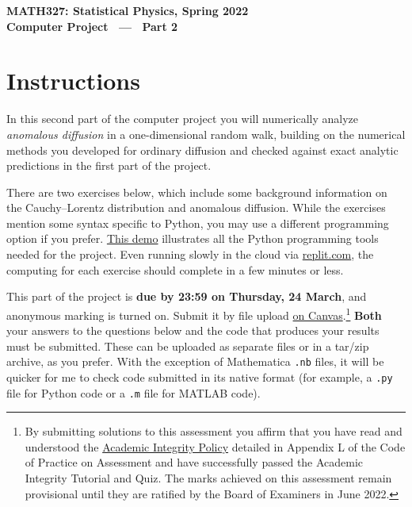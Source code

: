 \documentclass[12 pt]{article} %
\begin{document}
\newcommand{\thisunit}{MATH327 Project Part 2}
\newcommand{\moddate}{Last modified 23 Mar.~2022}
\begin{center}
  {\Large \textbf{MATH327: Statistical Physics, Spring 2022}} \\[12 pt]
  {\Large \textbf{Computer Project \ --- \ Part 2}} \\[24 pt]
\end{center}

\section*{Instructions}
In this second part of the computer project you will numerically analyze \textit{anomalous diffusion} in a one-dimensional random walk, building on the numerical methods you developed for ordinary diffusion and checked against exact analytic predictions in the first part of the project.

There are two exercises below, which include some background information on the Cauchy--Lorentz distribution and anomalous diffusion.
While the exercises mention some syntax specific to Python, you may use a different programming option if you prefer.
\href{https://tinyurl.com/math327demo}{This demo} illustrates all the Python programming tools needed for the project.
Even running slowly in the cloud via \href{https://replit.com/languages/python3}{replit.com}, the computing for each exercise should complete in a few minutes or less.

This part of the project is \textbf{due by 23:59 on Thursday, 24 March}, and anonymous marking is turned on.
Submit it by file upload \href{https://liverpool.instructure.com/courses/47333/assignments/178543}{on Canvas}.\footnote{By submitting solutions to this assessment you affirm that you have read and understood the \href{https://www.liverpool.ac.uk/media/livacuk/tqsd/code-of-practice-on-assessment/appendix_L_cop_assess.pdf}{Academic Integrity Policy} detailed in Appendix L of the Code of Practice on Assessment and have successfully passed the Academic Integrity Tutorial and Quiz.  The marks achieved on this assessment remain provisional until they are ratified by the Board of Examiners in June 2022.}
\textbf{Both} your answers to the questions below and the code that produces your results must be submitted.
These can be uploaded as separate files or in a tar/zip archive, as you prefer.
With the exception of Mathematica \texttt{.nb} files, it will be quicker for me to check code submitted in its native format (for example, a \texttt{.py} file for Python code or a \texttt{.m} file for MATLAB code).
\end{document}
